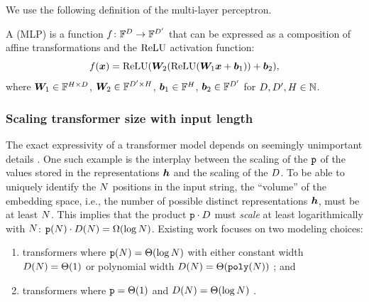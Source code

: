 We use the following definition of the multi-layer perceptron.
\begin{definition} \label{def:mlp}
   A  (MLP) is a function ${{{f}}}\colon {{\mathbb{F}}}^{{D}} \to {{\mathbb{F}}}^{{{D}}'}$ that can be expressed as a composition of affine transformations and the ${{\mathrm{ReLU}}}$ activation function:
   \begin{equation}
      {{{f}}}({{{\bm{x}}}}) = {{\mathrm{ReLU}}}({{{\bm{W}}}}_2 ({{\mathrm{ReLU}}}({{{\bm{W}}}}_1 {{{\bm{x}}}} + {{{\bm{b}}}}_1)) + {{{\bm{b}}}}_2),
   \end{equation}
   where ${{{\bm{W}}}}_1 \in {{\mathbb{F}}}^{H \times {{D}}}$, ${{{\bm{W}}}}_2 \in {{\mathbb{F}}}^{{{D}}' \times H}$, ${{{\bm{b}}}}_1 \in {{\mathbb{F}}}^{H}$, ${{{\bm{b}}}}_2 \in {{\mathbb{F}}}^{{{D}}'}$ for ${{D}}, {{D}}', H \in {{\mathbb{N}}}$.
\end{definition}



\subsubsection{Scaling transformer size with input length} \label{app:scaling-transformers}
The exact expressivity of a transformer model depends on seemingly unimportant details \citep{jerad2025uniquehardattentiontale}. 
One such example is the interplay between the scaling of the  ${{\texttt{p}}}$ of the values stored in the representations ${{{{{\bm{h}}}}}}$ and the scaling of the  ${{D}}$.
To be able to uniquely identify the ${{N}}$ positions in the input string, the ``volume'' of the embedding space, i.e., the number of possible distinct representations ${{{{{\bm{h}}}}}}$, must be at least ${{N}}$.
This implies that the product ${{\texttt{p}}} \cdot {{D}}$ must \emph{scale} at least logarithmically with ${{N}}$: $\numPrecFun{\strlen} \cdot \hiddDimFun{\strlen} = \bigOmegaFun{\log\strlen}$.
Existing work focuses on two modeling choices: 
\begin{enumerate}[label=(\arabic*)]
   
   \item {} transformers where $\numPrecFun{\strlen} = \bigThetaFun{\log\strlen}$ with either constant width $\hiddDimFun{\strlen} = \bigThetaFun{1}$ or polynomial width $\hiddDimFun{\strlen} = \bigThetaFun{\poly(\strlen)}$ \citep{merrill-sabharwal-2023-parallelism,merrill2024the,li2024chain,london2025pausetokensstrictlyincrease,merrill2025littledepthgoeslong,merrill2025exactexpressivepowertransformers}; and
   
   \item {} transformers where ${{\texttt{p}}} = {{{{\Theta}}(1)}}$ and $\hiddDimFun{\strlen} = \bigThetaFun{\log\strlen}$ \citep{li2024chain,saunshi2025reasoninglatentthoughtspower,london2025pausetokensstrictlyincrease}.
   
\end{enumerate}
